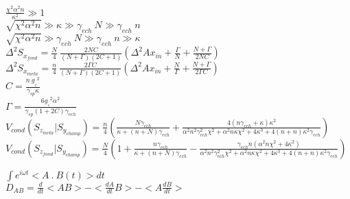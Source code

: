 \documentclass[a4paper,10pt]{report}
\begin{document}
\begin{Large}

$ \frac{\chi^2 \alpha^2 n}{\kappa^2} \gg 1$\\

$ \sqrt{\chi^2 \alpha^2 n} \gg \kappa \gg \gamma_{ech} \ N \gg \gamma_{ech} \ n$\\

$ \sqrt{\chi^2 \alpha^2 n}\gg \gamma_{ech} \ N \gg \gamma_{ech} \ n \gg \kappa $\\

$\Delta^2 {S}_{x_{fond}} = \frac{N}{4} \ \frac{2 N C}{(N + \Gamma) (2 C + 1)}
\left ( \Delta^2 Ax_{in} + \frac{\Gamma}{N} + \frac{N + \Gamma}{2 N C} \right
)$\\

$\Delta^2 {S}_{x_{meta}} = \frac{n}{4} \ \frac{2 \Gamma C}{(N + \Gamma) (2 C +
1)} \left ( \Delta^2 Ax_{in} + \frac{N}{\Gamma} + \frac{N + \Gamma}{2 \Gamma C}
\right
)$\\

$C = \frac{n \ {{g}_{_2}}^2}{\gamma_{sp} \kappa}$\\

$\Gamma = \frac{6 {g_{_1}}^2 \alpha^2}{\gamma_{sp} (1+2C) \gamma_{ech}}$\\

$V_{cond}({S}_{z_{meta}} | {S}_{y_{champ}}) = \frac{n}{4} \left ( \frac{N
\gamma_{ech} }{ \kappa+(n+N)\gamma_{ech} } + \frac{ 4(n \gamma_{ech} + \kappa)
\kappa^2 }{ \alpha^2 n^2 \gamma_{ech}^2 \chi^2 + \alpha^2 n \kappa \chi^2 + 4
\kappa^3 + 4(n+n) \kappa^2 \gamma_{ech} } \right )$\\

$V_{cond}({S}_{z_{fond}} | {S}_{y_{champ}}) = \frac{N}{4} \left ( 1+ \frac{n
\gamma_{ech} }{ \kappa+(n+N)\gamma_{ech} }
 -\frac{ \gamma_{ech} n (\alpha^2 n \chi^2 + 4 \kappa^2)}
        { \alpha^2 n^2 \gamma_{ech}^2 \chi^2 + \alpha^2 n \kappa \chi^2 + 4
\kappa^3 + 4(n+n) \kappa^2 \gamma_{ech} } \right )$

$ \int e^{i \omega t} < A \ . \ B(t) > dt$\\

$D_{AB} = \frac{d}{dt} < A B > - < \frac{d A}{dt} B> - < A \frac{d B}{dt} >$\\



\end{Large}

\end{document}
